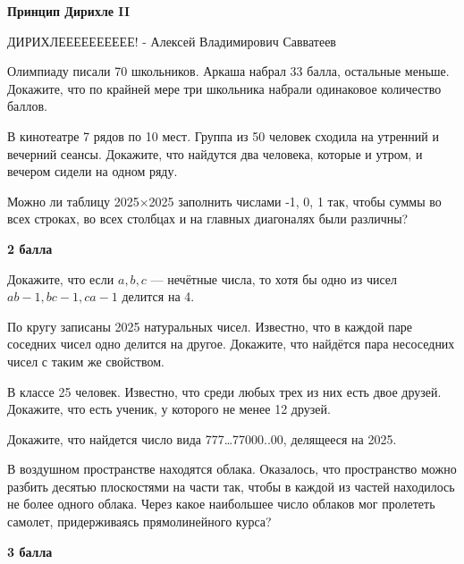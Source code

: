 \centerline{\bf \Huge Принцип Дирихле II}

\begin{flushright}
        \scriptsize{ДИРИХЛЕЕЕЕЕЕЕЕЕЕ! - Алексей Владимирович Савватеев}
\end{flushright}


 Олимпиаду писали 70 школьников. Аркаша набрал 33 балла, остальные меньше. Докажите, что по крайней мере три школьника набрали одинаковое количество баллов.





 В кинотеатре 7 рядов по 10 мест. Группа из 50 человек сходила на утренний и вечерний сеансы. Докажите, что найдутся два человека, которые и утром, и вечером сидели на одном ряду.



 Можно ли таблицу 2025×2025 заполнить числами -1, 0, 1 так, чтобы суммы во всех строках, во всех столбцах и на главных диагоналях были различны?

\begin{flushright} \textbf{2 балла}\\ 
\end{flushright}


 Докажите, что если $a, b, c$ — нечётные числа, то хотя бы одно из чисел $ab - 1, bc - 1, ca - 1$ делится на 4.



По кругу записаны 2025 натуральных чисел. Известно, что в каждой паре соседних чисел одно делится на другое. Докажите, что найдётся пара несоседних чисел с таким же свойством.



  В классе 25 человек. Известно, что среди любых трех из них есть двое друзей. Докажите, что есть ученик, у которого не менее 12 друзей.\




 Докажите, что найдется число вида 777…77000..00, делящееся на 2025.


 В воздушном пространстве находятся облака. Оказалось, что пространство можно разбить десятью плоскостями на части так, чтобы в каждой из частей находилось не более одного облака. Через какое наибольшее число облаков мог пролететь самолет, придерживаясь прямолинейного курса?

\begin{flushright} \textbf{3 балла}\\ 
\end{flushright}